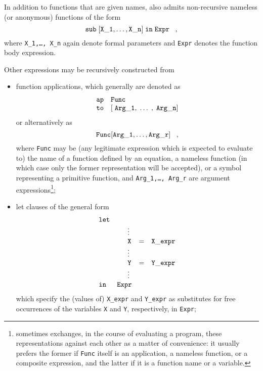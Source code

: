 In addition to functions that are given names, \kir also
admits non-recursive {\mys nameless} (or {\mys anonymous)
functions} of the form
$$
{\tt sub\; [X\_1,\ldots, X\_n]\; in\;Expr}\;\;\;,
$$
where {\tt X\_1,\ldots, X\_n} again denote formal parameters
and {\tt Expr} denotes the function body expression.

Other expressions may be recursively constructed from
\begin{itemize}
\item {\mys function applications},
which generally are denoted as
$$
\begin{array}{rl}
{\tt ap} & {\tt Func} \\
{\tt to} & {\tt [\;Arg\_1,\;\ldots\;,\;Arg\_n]}
\end{array}
$$
or alternatively as
$$
 {\tt Func[Arg\_1,\ldots, Arg\_r]}\;\;\;,
$$
where {\tt Func} may be (any legitimate \kir expression which
is expected to evaluate to)  the name of a function defined
by an equation, a nameless function (in which case only the
former representation will be accepted),
or a symbol representing a primitive function, and
{\tt Arg\_1,\ldots, Arg\_r} are argument expressions\footnote{\pired sometimes exchanges, in the course of evaluating a program,
 these representations against each other as a matter of convenience:
 it usually prefers the former if {\tt Func} itself is an application, a
nameless function, or a composite expression, and the latter if it is a function name or
a variable.};
\item
\arraycolsep 2pt
{\sc let} {\mys clauses} of the general form
$$
\begin{array}{llcl}
{\tt let} & \; & \; & \;
\\ &\phantom{{\sc in}\;\;}\vdots \\
&\phantom{{\sc in}\;\;}{\tt X}&=&{\tt X\_expr} \\
&\phantom{{\sc in}\;\;}\vdots\\
&\phantom{{\sc in}\;\;}{\tt Y}&=&{\tt Y\_expr} \\
&\phantom{{\sc in}\;\;}\vdots \\
{\tt in} \; & {\tt Expr} & \;&\;
\end{array}
$$
which specify the (values of) {\tt X\_expr} and {\tt Y\_expr} as substitutes
for free occurrences of the variables {\tt X} and {\tt Y}, respectively,
in {\tt Expr};
\arraycolsep 5pt

\end{itemize}
